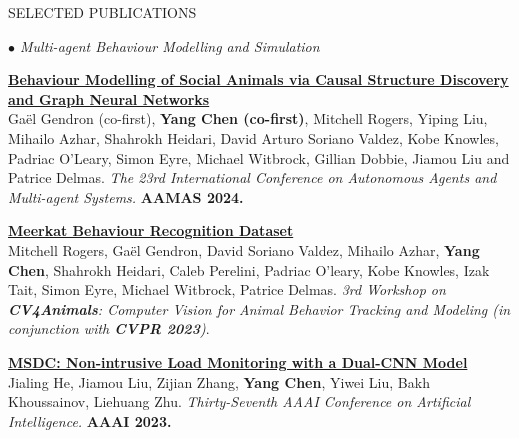 \documentclass{resume} %
\begin{document}
\begin{rSection}{SELECTED PUBLICATIONS}
\begin{rSubsection}{\large\em $\bullet$ Multi-agent Behaviour Modelling and Simulation}{}{}{}
	\item {\href{https://arxiv.org/abs/2312.14333}{\bf Behaviour Modelling of Social Animals via Causal Structure Discovery and Graph Neural Networks}}\\
		Ga\"el Gendron (co-first), \textbf{Yang Chen (co-first)}, Mitchell Rogers, Yiping Liu, Mihailo Azhar, Shahrokh Heidari, David Arturo Soriano Valdez, Kobe Knowles, Padriac O'Leary, Simon Eyre, Michael Witbrock, Gillian Dobbie, Jiamou Liu and Patrice Delmas. {\em  The 23rd International Conference on Autonomous Agents and Multi-agent Systems.} \textbf{AAMAS 2024.}\\
	\item {\href{https://arxiv.org/abs/2306.11326}{\bf Meerkat Behaviour Recognition Dataset}}\\Mitchell Rogers, Gaël Gendron, David Soriano Valdez, Mihailo Azhar, \textbf{Yang Chen}, Shahrokh Heidari, Caleb Perelini, Padriac O'leary, Kobe Knowles, Izak Tait, Simon Eyre, Michael Witbrock, Patrice Delmas. {\em 3rd Workshop on {\bf CV4Animals}: Computer Vision for Animal Behavior Tracking and Modeling (in conjunction with {\bf CVPR 2023})}.\\
	\item {
	\href{https://ojs.aaai.org/index.php/AAAI/article/download/25636/25408}{\bf MSDC: Non-intrusive Load Monitoring with a Dual-CNN Model}}\\
		Jialing He, Jiamou Liu, Zijian Zhang, \textbf{Yang Chen}, Yiwei Liu, Bakh Khoussainov, Liehuang Zhu. {\em Thirty-Seventh AAAI Conference on Artificial Intelligence.} \textbf{AAAI 2023.} \\
\end{rSubsection}


\end{rSection}
\end{document}
